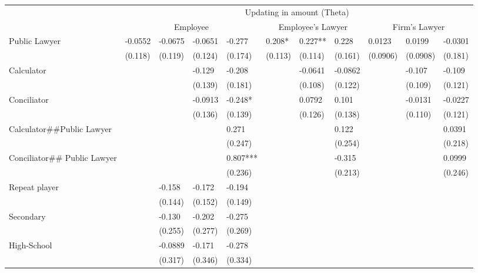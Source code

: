 \begin{tabular}{lllllllllll}
\cmidrule{2-11}\multicolumn{1}{l|}{} & \multicolumn{10}{c|}{Updating in amount (Theta)} \\
\cmidrule{2-11}      & \multicolumn{4}{c}{Employee}  & \multicolumn{3}{c}{Employee's Lawyer} & \multicolumn{3}{c}{Firm's  Lawyer} \\
\cmidrule{2-11}Public Lawyer & -0.0552 & -0.0675 & -0.0651 & -0.277 & 0.208* & 0.227** & 0.228 & 0.0123 & 0.0199 & -0.0301 \\
      & (0.118) & (0.119) & (0.124) & (0.174) & (0.113) & (0.114) & (0.161) & (0.0906) & (0.0908) & (0.181) \\
Calculator &       &       & -0.129 & -0.208 &       & -0.0641 & -0.0862 &       & -0.107 & -0.109 \\
      &       &       & (0.139) & (0.181) &       & (0.108) & (0.122) &       & (0.109) & (0.121) \\
Conciliator &       &       & -0.0913 & -0.248* &       & 0.0792 & 0.101 &       & -0.0131 & -0.0227 \\
      &       &       & (0.136) & (0.139) &       & (0.126) & (0.138) &       & (0.110) & (0.121) \\
Calculator\#\#Public Lawyer &       &       &       & 0.271 &       &       & 0.122 &       &       & 0.0391 \\
      &       &       &       & (0.247) &       &       & (0.254) &       &       & (0.218) \\
Conciliator\#\# Public Lawyer &       &       &       & 0.807*** &       &       & -0.315 &       &       & 0.0999 \\
      &       &       &       & (0.236) &       &       & (0.213) &       &       & (0.246) \\
Repeat player &       & -0.158 & -0.172 & -0.194 &       &       &       &       &       &  \\
      &       & (0.144) & (0.152) & (0.149) &       &       &       &       &       &  \\
Secondary &       & -0.130 & -0.202 & -0.275 &       &       &       &       &       &  \\
      &       & (0.255) & (0.277) & (0.269) &       &       &       &       &       &  \\
High-School &       & -0.0889 & -0.171 & -0.278 &       &       &       &       &       &  \\
      &       & (0.317) & (0.346) & (0.334) &       &       &       &       &       &  \\

\end{tabular}
